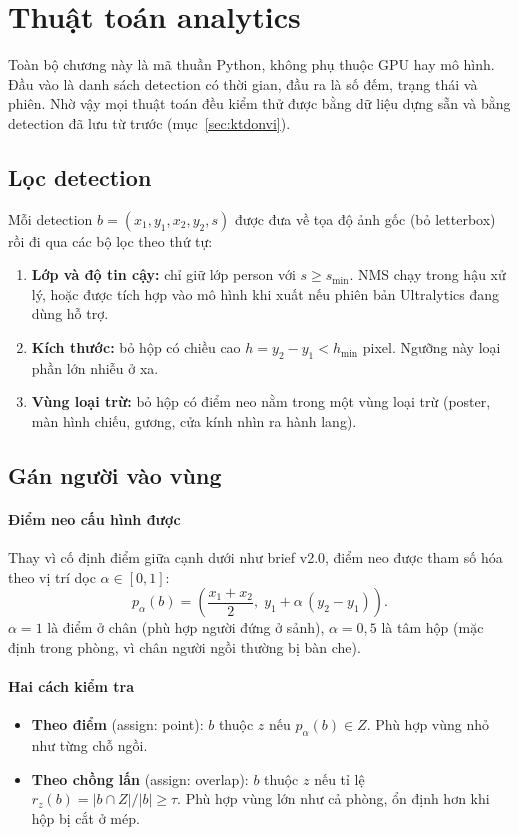 \documentclass[10pt,a4paper,oneside,openany]{report}
\newcommand{\breakus}{\textunderscore\allowbreak}
\newcommand{\code}[1]{{\ttfamily\let\_\breakus #1}}
\begin{document}
\chapter{Thuật toán analytics}\label{ch:thuattoan}

Toàn bộ chương này là mã thuần Python, không phụ thuộc GPU hay mô hình. Đầu vào là danh sách detection có thời gian,
đầu ra là số đếm, trạng thái và phiên. Nhờ vậy mọi thuật toán đều kiểm thử được bằng dữ liệu dựng sẵn và bằng detection
đã lưu từ trước (mục~\ref{sec:ktdonvi}).

\section{Lọc detection}\label{sec:loc}
Mỗi detection $b = (x_1, y_1, x_2, y_2, s)$ được đưa về tọa độ ảnh gốc (bỏ letterbox) rồi đi qua các bộ lọc theo thứ tự:
\begin{enumerate}
  \item \textbf{Lớp và độ tin cậy:} chỉ giữ lớp \code{person} với $s \ge s_{\min}$. NMS chạy trong hậu xử lý, hoặc được tích hợp vào
        mô hình khi xuất nếu phiên bản Ultralytics đang dùng hỗ trợ.
  \item \textbf{Kích thước:} bỏ hộp có chiều cao $h = y_2 - y_1 < h_{\min}$ pixel. Ngưỡng này loại phần lớn nhiễu ở xa.
  \item \textbf{Vùng loại trừ:} bỏ hộp có điểm neo nằm trong một vùng loại trừ (poster, màn hình chiếu, gương, cửa kính nhìn ra hành lang).
\end{enumerate}

\section{Gán người vào vùng}\label{sec:gan}
\subsubsection{Điểm neo cấu hình được}
Thay vì cố định điểm giữa cạnh dưới như brief v2.0, điểm neo được tham số hóa theo vị trí dọc $\alpha \in [0,1]$:
\begin{equation}
  p_\alpha(b) = \left(\frac{x_1 + x_2}{2},\; y_1 + \alpha\,(y_2 - y_1)\right).
\end{equation}
$\alpha = 1$ là điểm ở chân (phù hợp người đứng ở sảnh), $\alpha = 0{,}5$ là tâm hộp (mặc định trong phòng, vì chân người ngồi thường bị bàn che).

\subsubsection{Hai cách kiểm tra}
\begin{itemize}
  \item \textbf{Theo điểm} (\code{assign: point}): $b$ thuộc $z$ nếu $p_\alpha(b) \in Z$. Phù hợp vùng nhỏ như từng chỗ ngồi.
  \item \textbf{Theo chồng lấn} (\code{assign: overlap}): $b$ thuộc $z$ nếu tỉ lệ
        $r_z(b) = |b \cap Z| / |b| \ge \tau$. Phù hợp vùng lớn như cả phòng, ổn định hơn khi hộp bị cắt ở mép.
\end{itemize}
\end{document}
